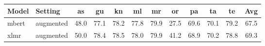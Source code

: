 \begin{tabular}{llcccccccccc}
\toprule
Model & Setting & as & gu & kn & ml & mr & or & pa & ta & te & Avg \\
\midrule
mbert & augmented & 48.0 & 77.1 & 78.2 & 77.8 & 79.9 & 27.5 & 69.6 & 70.1 & 79.2 & 67.5 \\
xlmr & augmented & 50.0 & 78.4 & 78.5 & 78.0 & 79.9 & 41.2 & 68.9 & 70.2 & 78.8 & 69.3 \\
\bottomrule
\end{tabular}
